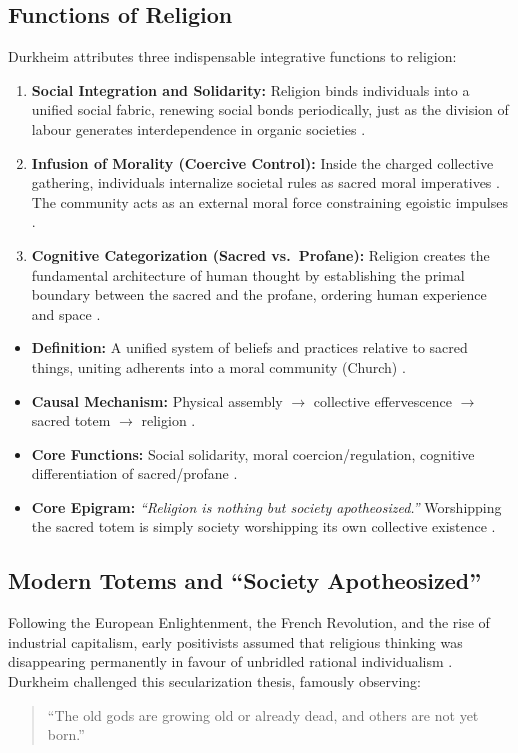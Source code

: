 \subsection{Functions of Religion}

Durkheim attributes three indispensable integrative functions to religion:
\begin{enumerate}
    \item \textbf{Social Integration and Solidarity:} Religion binds individuals into a unified social fabric, renewing social bonds periodically, just as the division of labour generates interdependence in organic societies .
    \item \textbf{Infusion of Morality (Coercive Control):} Inside the charged collective gathering, individuals internalize societal rules as sacred moral imperatives . The community acts as an external moral force constraining egoistic impulses .
    \item \textbf{Cognitive Categorization (Sacred vs.\ Profane):} Religion creates the fundamental architecture of human thought by establishing the primal boundary between the sacred and the profane, ordering human experience and space .
\end{enumerate}

\begin{QuickRevision}
\begin{itemize}
    \item \textbf{Definition:} A unified system of beliefs and practices relative to sacred things, uniting adherents into a moral community (Church) .
    \item \textbf{Causal Mechanism:} Physical assembly $\rightarrow$ collective effervescence $\rightarrow$ sacred totem $\rightarrow$ religion .
    \item \textbf{Core Functions:} Social solidarity, moral coercion/regulation, cognitive differentiation of sacred/profane .
    \item \textbf{Core Epigram:} \textit{``Religion is nothing but society apotheosized.''} Worshipping the sacred totem is simply society worshipping its own collective existence .
\end{itemize}
\end{QuickRevision}

\subsection{Modern Totems and ``Society Apotheosized''}

Following the European Enlightenment, the French Revolution, and the rise of industrial capitalism, early positivists assumed that religious thinking was disappearing permanently in favour of unbridled rational individualism . Durkheim challenged this secularization thesis, famously observing:
\begin{quote}
``The old gods are growing old or already dead, and others are not yet born.'' 
\end{quote}

